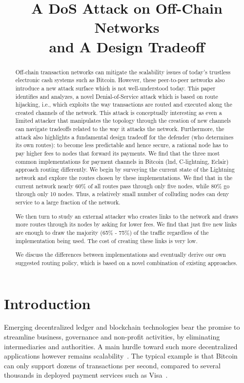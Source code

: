 \title{A DoS Attack on Off-Chain Networks\\and A Design Tradeoff}



\maketitle

\begin{abstract}
Off-chain transaction networks can mitigate the scalability
issues of today's trustless electronic cash systems such as Bitcoin. 
However, these peer-to-peer networks also introduce a new attack surface which is not well-understood today.
This paper identifies and analyzes,  a novel Denial-of-Service attack
which is based on route hijacking, i.e., 
which exploits the way transactions are routed and executed along 
the created channels of the network.
This attack is conceptually interesting as even a limited attacker that manipulates the topology through the creation of new channels
can navigate tradeoffs related to the way it attacks the network. 
Furthermore, the attack also highlights a fundamental design tradeoff for the defender
(who determines its own routes): 
to become less predictable and hence secure, a rational node has to pay higher fees to nodes that forward its payments.
We find that the three most common implementations for payment channels in Bitcoin (lnd, C-lightning, Eclair) approach routing differently. We begin by surveying the current state of the Lightning network and explore the routes chosen by these implementations. We find that in the current network nearly 60\% of all routes pass through only five nodes, while 80\% go through only 10 nodes. Thus, a relatively small number of colluding nodes can deny service to a large fraction of the network. 

We then turn to study an external attacker who creates links to the network and draws more routes through its nodes by asking for lower fees. We find that just five new links are enough to draw the majority (65\% - 75\%) of the traffic regardless of the implementation being used.  The cost of creating these links is very low.

We discuss the differences between implementations and eventually derive our own suggested routing policy, which is based on a novel combination of existing approaches. 
\end{abstract}

\section{Introduction}\label{sec:intro}
Emerging decentralized ledger and blockchain technologies bear the promise to
streamline business, governance and non-profit activities, by
eliminating intermediaries and authorities.
A main hurdle toward such more decentralized applications however
remains scalability~\cite{bamert2013have,decker2015fast,sompolinsky2013accelerating}. The typical example is that Bitcoin can only support
dozens of transactions per second, compared to several thousands
in deployed payment services such as Visa~\cite{trillo2013stress}. 

